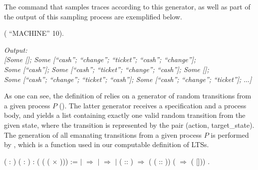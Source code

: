 The command that samples traces according to this generator, as well as part of the output of this sampling process are exemplified below.

\begin{coqdoccode}
	\coqdocnoindent
	 (  ``MACHINE'' 10).\coqdoceol
\end{coqdoccode}

\begin{tabbing}
	\emph{Output:}\\
	\emph{[Some []; Some [``cash''; ``change''; ``ticket''; ``cash''; ``change''];}\\
	\emph{Some [``cash'']; Some [``cash''; ``ticket''; ``change''; ``cash'']; Some [];}\\
	\emph{Some [``cash''; ``change''; ``ticket''; ``cash'']; Some [``cash''; ``change''; ``ticket'']; $\dots$]}
\end{tabbing}

As one can see, the definition of  relies on a generator of random transitions from a given process $P$ (). The latter generator receives a specification and a process body, and yields a list containing exactly one valid random transition from the given state, where the transition is represented by the pair (action, target\_state). The generation of all emanating transitions from a given process $P$ is performed by , which is a function used in our computable definition of LTSs.

\begin{coqdoccode}
	\coqdocnoindent
	 \coqdoceol
	\coqdocindent{1.00em}
	( : )\coqdoceol
	\coqdocindent{1.00em}
	( : )\coqdoceol
	\coqdocindent{1.00em}
	:  ( ( ( \ensuremath{\times} ))) :=\coqdoceol
	\coqdocindent{1.00em}
	    \coqdoceol
	\coqdocindent{1.00em}
	\ensuremath{|}  \ensuremath{\Rightarrow}  \coqdoceol
	\coqdocindent{1.00em}
	\ensuremath{|}   \ensuremath{\Rightarrow}  \coqdoceol
	\coqdocindent{1.00em}
	\ensuremath{|}  ( :: ) \ensuremath{\Rightarrow}  (  ( :: )) (  \ensuremath{\Rightarrow}  ( []))\coqdoceol
	\coqdocindent{1.00em}
	.\coqdoceol
\end{coqdoccode}

